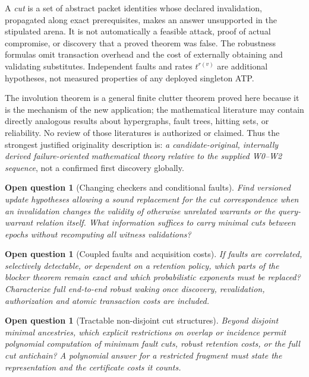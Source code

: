 \documentclass[11pt,letterpaper]{article}
\newtheorem{question}[theorem]{Open question}
\begin{document}
A \emph{cut} is a set of abstract packet identities whose declared invalidation, propagated along exact prerequisites, makes an answer unsupported in the stipulated arena. It is not automatically a feasible attack, proof of actual compromise, or discovery that a proved theorem was false. The robustness formulas omit transaction overhead and the cost of externally obtaining and validating substitutes. Independent faults and rates $t^{r(v)}$ are additional hypotheses, not measured properties of any deployed singleton ATP.

The involution theorem is a general finite clutter theorem proved here because it is the mechanism of the new application; the mathematical literature may contain directly analogous results about hypergraphs, fault trees, hitting sets, or reliability. No review of those literatures is authorized or claimed. Thus the strongest justified originality description is: \emph{a candidate-original, internally derived failure-oriented mathematical theory relative to the supplied W0--W2 sequence}, not a confirmed first discovery globally.

\begin{question}[Changing checkers and conditional faults]\label{prob:dynamic}
Find versioned update hypotheses allowing a sound replacement for the cut correspondence when an invalidation changes the validity of otherwise unrelated warrants or the query-warrant relation itself. What information suffices to carry minimal cuts between epochs without recomputing all witness validations?
\end{question}
\begin{question}[Coupled faults and acquisition costs]\label{prob:coupled}
If faults are correlated, selectively detectable, or dependent on a retention policy, which parts of the blocker theorem remain exact and which probabilistic exponents must be replaced? Characterize full end-to-end robust waking once discovery, revalidation, authorization and atomic transaction costs are included.
\end{question}
\begin{question}[Tractable non-disjoint cut structures]\label{prob:tractable}
Beyond disjoint minimal ancestries, which explicit restrictions on overlap or incidence permit polynomial computation of minimum fault cuts, robust retention costs, or the full cut antichain? A polynomial answer for a restricted fragment must state the representation and the certificate costs it counts.
\end{question}
\end{document}
